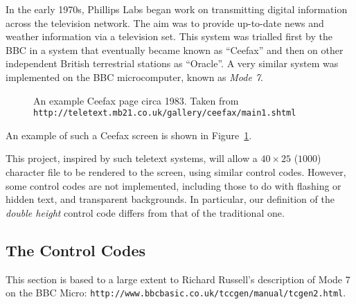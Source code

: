 


In the early 1970s, Phillips Labs began work on transmitting digital
information across the television network. The aim was to
provide up-to-date news and weather information via a television set. 
This system was trialled first by the BBC in a system that eventually became
known as ``Ceefax'' and then on other independent British terrestrial stations as ``Oracle''.
A very similar system was implemented on the BBC microcomputer, known as {\it Mode 7}.
\begin{figure}[ht]
\caption{An example Ceefax page circa 1983. Taken from {\tt http://teletext.mb21.co.uk/gallery/ceefax/main1.shtml}}
\label{fig:tt100}
\end{figure}
An example of such a Ceefax screen is shown in Figure~\ref{fig:tt100}.

This project, inspired by such teletext systems, will allow a $40 \times 25$ ($1000$) character
file to be rendered to the screen, using similar control codes. However, some control
codes are not implemented, including those to do with flashing or hidden text, and transparent backgrounds. In particular, our definition of the {\it double height} control code differs from that of
the traditional one.

\subsection*{The Control Codes}

This section is based to a large extent to Richard Russell's description of
Mode 7 on the BBC Micro:
\verb^http://www.bbcbasic.co.uk/tccgen/manual/tcgen2.html^.

